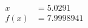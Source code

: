 \documentclass[preview]{standalone}
\begin{document}
\begin{align*}
x &= 5.0291\\f(x) &= 7.9998941
\end{align*}
\end{document}
